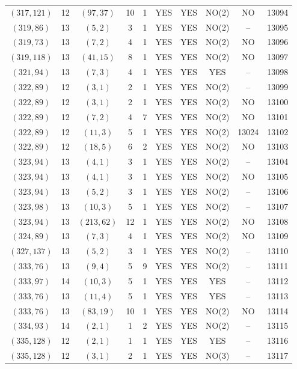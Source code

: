 \begin{longtable}{|c|c|c|c|c|c|c|c|c|c|}
$(317, 121)$ & 12 & $(97, 37)$ & 10 & 1 & YES & YES & NO(2) & NO & 13094\\
$(319, 86)$ & 13 & $(5, 2)$ & 3 & 1 & YES & YES & NO(2) & -- & 13095\\
$(319, 73)$ & 13 & $(7, 2)$ & 4 & 1 & YES & YES & NO(2) & NO & 13096\\
$(319, 118)$ & 13 & $(41, 15)$ & 8 & 1 & YES & YES & NO(2) & NO & 13097\\
$(321, 94)$ & 13 & $(7, 3)$ & 4 & 1 & YES & YES & YES & -- & 13098\\
$(322, 89)$ & 12 & $(3, 1)$ & 2 & 1 & YES & YES & NO(2) & -- & 13099\\
$(322, 89)$ & 12 & $(3, 1)$ & 2 & 1 & YES & YES & NO(2) & NO & 13100\\
$(322, 89)$ & 12 & $(7, 2)$ & 4 & 7 & YES & YES & NO(2) & NO & 13101\\
$(322, 89)$ & 12 & $(11, 3)$ & 5 & 1 & YES & YES & NO(2) & 13024 & 13102\\
$(322, 89)$ & 12 & $(18, 5)$ & 6 & 2 & YES & YES & NO(2) & NO & 13103\\
$(323, 94)$ & 13 & $(4, 1)$ & 3 & 1 & YES & YES & NO(2) & -- & 13104\\
$(323, 94)$ & 13 & $(4, 1)$ & 3 & 1 & YES & YES & NO(2) & NO & 13105\\
$(323, 94)$ & 13 & $(5, 2)$ & 3 & 1 & YES & YES & NO(2) & -- & 13106\\
$(323, 98)$ & 13 & $(10, 3)$ & 5 & 1 & YES & YES & NO(2) & -- & 13107\\
$(323, 94)$ & 13 & $(213, 62)$ & 12 & 1 & YES & YES & NO(2) & NO & 13108\\
$(324, 89)$ & 13 & $(7, 3)$ & 4 & 1 & YES & YES & NO(2) & NO & 13109\\
$(327, 137)$ & 13 & $(5, 2)$ & 3 & 1 & YES & YES & NO(2) & -- & 13110\\
$(333, 76)$ & 13 & $(9, 4)$ & 5 & 9 & YES & YES & NO(2) & -- & 13111\\
$(333, 97)$ & 14 & $(10, 3)$ & 5 & 1 & YES & YES & YES & -- & 13112\\
$(333, 76)$ & 13 & $(11, 4)$ & 5 & 1 & YES & YES & YES & -- & 13113\\
$(333, 76)$ & 13 & $(83, 19)$ & 10 & 1 & YES & YES & NO(2) & NO & 13114\\
$(334, 93)$ & 14 & $(2, 1)$ & 1 & 2 & YES & YES & NO(2) & -- & 13115\\
$(335, 128)$ & 12 & $(2, 1)$ & 1 & 1 & YES & YES & YES & -- & 13116\\
$(335, 128)$ & 12 & $(3, 1)$ & 2 & 1 & YES & YES & NO(3) & -- & 13117\\

\end{longtable}
